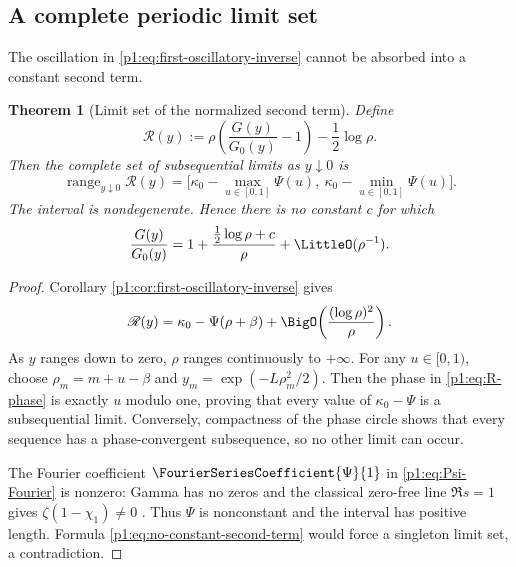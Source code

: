 \documentclass[11pt,oneside]{article}
\numberwithin{equation}{section}
\newtheorem{theorem}{Theorem}[section]
\theoremstyle{definition}
\theoremstyle{remark}
\newcommand{\range}{\operatorname{range}}
\begin{document}
\subsection{A complete periodic limit set}

The oscillation in \eqref{p1:eq:first-oscillatory-inverse} cannot be absorbed into a
constant second term.

\begin{theorem}[Limit set of the normalized second term]
\label{p1:thm:inverse-limit-set}
Define
\begin{equation}
 \mathscr R(y):=
 \rho\left(\frac{G(y)}{G_0(y)}-1\right)-\frac12\log\rho.
 \label{p1:eq:R-limit-set}
\end{equation}
Then the complete set of subsequential limits as $y\downarrow0$ is
\begin{equation}
 \boxed{
 \range_{y\downarrow0}\mathscr R(y)
 =\bigl[\kappa_0-\max_{u\in[0,1]}\Psi(u),
         \ \kappa_0-\min_{u\in[0,1]}\Psi(u)\bigr].}
 \label{p1:eq:inverse-limit-interval}
\end{equation}
The interval is nondegenerate.  Hence there is no constant $c$ for which
\begin{equation}
 \frac{G(y)}{G_0(y)}
 =1+\frac{\tfrac12\log\rho+c}{\rho}+\LittleO(\rho^{-1}).
 \label{p1:eq:no-constant-second-term}
\end{equation}
\end{theorem}

\begin{proof}
Corollary \ref{p1:cor:first-oscillatory-inverse} gives
\begin{equation}
 \mathscr R(y)=\kappa_0-\Psi(\rho+\beta)
 +\BigO\!\left(\frac{(\log\rho)^2}{\rho}\right).
 \label{p1:eq:R-phase}
\end{equation}
As $y$ ranges down to zero, $\rho$ ranges continuously to $+\infty$.  For any
$u\in[0,1)$, choose $\rho_m=m+u-\beta$ and
$y_m=\exp(-L\rho_m^2/2)$.  Then the phase in \eqref{p1:eq:R-phase} is exactly
$u$ modulo one, proving that every value of $\kappa_0-\Psi$ is a subsequential
limit.  Conversely, compactness of the phase circle shows that every sequence has a
phase-convergent subsequence, so no other limit can occur.

The Fourier coefficient $\FourierSeriesCoefficient{\Psi}{1}$ in
\eqref{p1:eq:Psi-Fourier} is nonzero:
Gamma has no zeros and the classical zero-free line $\Re s=1$ gives
$\zeta(1-\chi_1)\ne0$ \cite{p1:TitchmarshZeta}.  Thus $\Psi$ is nonconstant and the interval has positive
length.  Formula \eqref{p1:eq:no-constant-second-term} would force a singleton limit set,
a contradiction.
\end{proof}
\end{document}
